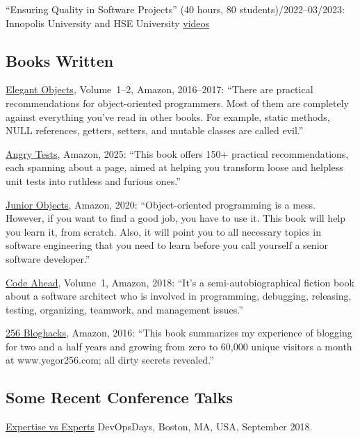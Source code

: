 \documentclass{yb}
\begin{document}
``Ensuring Quality in Software Projects'' (40 hours, 80 students)/2022--03/2023: Innopolis University and HSE University\newline
\href{https://www.youtube.com/playlist?list=PLaIsQH4uc08y14wCJMeffS2yErN4QpB8m}{videos}

\subsection*{Books Written}

\href{https://amzn.to/2E5UHqZ}{Elegant Objects}, Volume~1--2, Amazon, 2016--2017:
``There are practical recommendations for object-oriented programmers.
Most of them are completely against everything you've read in other books.
For example, static methods, NULL references, getters, setters, and mutable classes are called evil.''

\href{https://www.amazon.com/dp/B0F54QSHHS}{Angry Tests}, Amazon, 2025:
``This book offers 150+ practical recommendations, each spanning about a page,
aimed at helping you transform loose and helpless
unit tests into ruthless and furious ones.''

\href{https://amzn.to/2u9BbqF}{Junior Objects}, Amazon, 2020:
``Object-oriented programming is a mess. However,
if you want to find a good job, you have to use it.
This book will help you learn it, from scratch.
Also, it will point you to all necessary topics
in software engineering that you need to learn before
you call yourself a senior software developer.''

\href{https://amzn.to/2u9BbqF}{Code Ahead}, Volume~1, Amazon, 2018:
``It's a semi-autobiographical fiction book about a software architect
who is involved in programming, debugging, releasing, testing,
organizing, teamwork, and management issues.''

\href{https://amzn.to/2GkuyXf}{256 Bloghacks}, Amazon, 2016:
``This book summarizes my experience of blogging for two and a half years and growing from zero to 60,000
unique visitors a month at www.yegor256.com; all dirty secrets revealed.''

\subsection*{Some Recent Conference Talks}

\begin{samepage}
\href{https://youtu.be/KCx1o_lSMkI}{Expertise vs Experts}\newline
DevOpsDays, Boston, MA, USA, September 2018.
\end{samepage}
\end{document}

